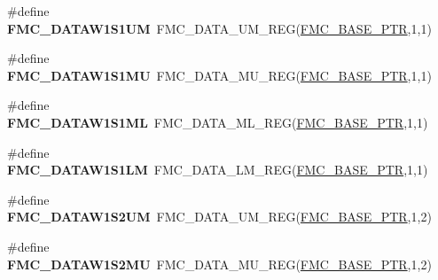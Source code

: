 \begin{DoxyCompactItemize}
\item 
\hypertarget{group___f_m_c___register___accessor___macros_gaa7658ab4de71814c949583f0311b5d0a}{}\#define {\bfseries F\+M\+C\+\_\+\+D\+A\+T\+A\+W1\+S1\+U\+M}~F\+M\+C\+\_\+\+D\+A\+T\+A\+\_\+\+U\+M\+\_\+\+R\+E\+G(\hyperlink{group___f_m_c___peripheral_ga0a740437b573e32e6b932bf729485fd9}{F\+M\+C\+\_\+\+B\+A\+S\+E\+\_\+\+P\+T\+R},1,1)\label{group___f_m_c___register___accessor___macros_gaa7658ab4de71814c949583f0311b5d0a}

\item 
\hypertarget{group___f_m_c___register___accessor___macros_gae43e7269b55d24c773323ba0217d2a9c}{}\#define {\bfseries F\+M\+C\+\_\+\+D\+A\+T\+A\+W1\+S1\+M\+U}~F\+M\+C\+\_\+\+D\+A\+T\+A\+\_\+\+M\+U\+\_\+\+R\+E\+G(\hyperlink{group___f_m_c___peripheral_ga0a740437b573e32e6b932bf729485fd9}{F\+M\+C\+\_\+\+B\+A\+S\+E\+\_\+\+P\+T\+R},1,1)\label{group___f_m_c___register___accessor___macros_gae43e7269b55d24c773323ba0217d2a9c}

\item 
\hypertarget{group___f_m_c___register___accessor___macros_gaa2bcba89cee50338e102ad6c06d77c1e}{}\#define {\bfseries F\+M\+C\+\_\+\+D\+A\+T\+A\+W1\+S1\+M\+L}~F\+M\+C\+\_\+\+D\+A\+T\+A\+\_\+\+M\+L\+\_\+\+R\+E\+G(\hyperlink{group___f_m_c___peripheral_ga0a740437b573e32e6b932bf729485fd9}{F\+M\+C\+\_\+\+B\+A\+S\+E\+\_\+\+P\+T\+R},1,1)\label{group___f_m_c___register___accessor___macros_gaa2bcba89cee50338e102ad6c06d77c1e}

\item 
\hypertarget{group___f_m_c___register___accessor___macros_ga1499e7461863ecccb75536ce109ea3e2}{}\#define {\bfseries F\+M\+C\+\_\+\+D\+A\+T\+A\+W1\+S1\+L\+M}~F\+M\+C\+\_\+\+D\+A\+T\+A\+\_\+\+L\+M\+\_\+\+R\+E\+G(\hyperlink{group___f_m_c___peripheral_ga0a740437b573e32e6b932bf729485fd9}{F\+M\+C\+\_\+\+B\+A\+S\+E\+\_\+\+P\+T\+R},1,1)\label{group___f_m_c___register___accessor___macros_ga1499e7461863ecccb75536ce109ea3e2}

\item 
\hypertarget{group___f_m_c___register___accessor___macros_gaef38b5ea0220bccd82ffaf7e400f5abf}{}\#define {\bfseries F\+M\+C\+\_\+\+D\+A\+T\+A\+W1\+S2\+U\+M}~F\+M\+C\+\_\+\+D\+A\+T\+A\+\_\+\+U\+M\+\_\+\+R\+E\+G(\hyperlink{group___f_m_c___peripheral_ga0a740437b573e32e6b932bf729485fd9}{F\+M\+C\+\_\+\+B\+A\+S\+E\+\_\+\+P\+T\+R},1,2)\label{group___f_m_c___register___accessor___macros_gaef38b5ea0220bccd82ffaf7e400f5abf}

\item 
\hypertarget{group___f_m_c___register___accessor___macros_ga68b000d840017f68d12e62f31c1cf8f7}{}\#define {\bfseries F\+M\+C\+\_\+\+D\+A\+T\+A\+W1\+S2\+M\+U}~F\+M\+C\+\_\+\+D\+A\+T\+A\+\_\+\+M\+U\+\_\+\+R\+E\+G(\hyperlink{group___f_m_c___peripheral_ga0a740437b573e32e6b932bf729485fd9}{F\+M\+C\+\_\+\+B\+A\+S\+E\+\_\+\+P\+T\+R},1,2)\label{group___f_m_c___register___accessor___macros_ga68b000d840017f68d12e62f31c1cf8f7}


\end{DoxyCompactItemize}
